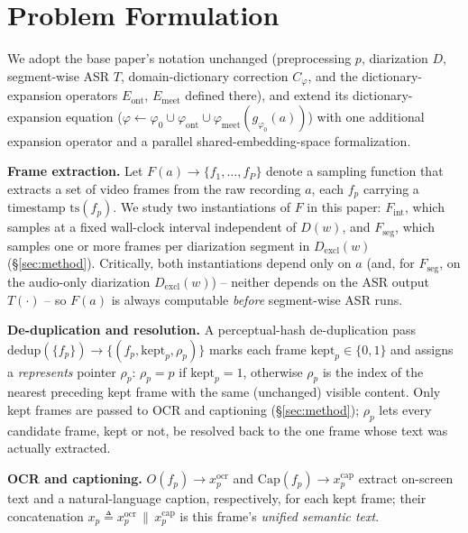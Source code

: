 ﻿\documentclass[twocolumn]{article}
\begin{document}
\section{Problem Formulation}
\label{sec:formulation}

We adopt the base paper's notation unchanged (preprocessing $p$, diarization $D$, segment-wise ASR
$T$, domain-dictionary correction $C_\varphi$, and the dictionary-expansion operators
$E_{\text{ont}}$, $E_{\text{meet}}$ defined there), and extend its dictionary-expansion equation
($\varphi \leftarrow \varphi_0 \cup \varphi_{\text{ont}} \cup \varphi_{\text{meet}}(g_{\varphi_0}(a))$)
with one additional expansion operator and a parallel shared-embedding-space formalization.

\textbf{Frame extraction.} Let $F(a) \rightarrow \{f_1,\dots,f_P\}$ denote a sampling function that
extracts a set of video frames from the raw recording $a$, each $f_p$ carrying a timestamp
$\mathrm{ts}(f_p)$. We study two instantiations of $F$ in this paper: $F_{\text{int}}$, which
samples at a fixed wall-clock interval independent of $D(w)$, and $F_{\text{seg}}$, which samples
one or more frames per diarization segment in $D_{\text{excl}}(w)$ (\S\ref{sec:method}). Critically,
both instantiations depend only on $a$ (and, for $F_{\text{seg}}$, on the audio-only diarization
$D_{\text{excl}}(w)$) -- neither depends on the ASR output $T(\cdot)$ -- so $F(a)$ is always
computable \emph{before} segment-wise ASR runs.

\textbf{De-duplication and resolution.} A perceptual-hash de-duplication pass
$\mathrm{dedup}(\{f_p\}) \rightarrow \{(f_p, \mathrm{kept}_p, \rho_p)\}$ marks each frame
$\mathrm{kept}_p \in \{0,1\}$ and assigns a \emph{represents} pointer $\rho_p$: $\rho_p = p$ if
$\mathrm{kept}_p = 1$, otherwise $\rho_p$ is the index of the nearest preceding kept frame with the
same (unchanged) visible content. Only kept frames are passed to OCR and captioning
(\S\ref{sec:method}); $\rho_p$ lets every candidate frame, kept or not, be resolved back to the one
frame whose text was actually extracted.

\textbf{OCR and captioning.} $O(f_p) \rightarrow x^{\text{ocr}}_p$ and $\mathrm{Cap}(f_p) \rightarrow
x^{\text{cap}}_p$ extract on-screen text and a natural-language caption, respectively, for each kept
frame; their concatenation $x_p \triangleq x^{\text{ocr}}_p \,\|\, x^{\text{cap}}_p$ is this frame's
\emph{unified semantic text}.
\end{document}
